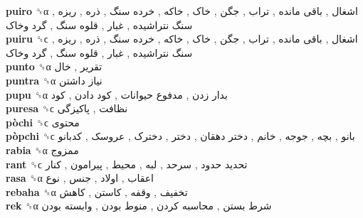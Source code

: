 \textbf{puiro} ␝α   اشغال ,  باقی مانده ,  تراب ,  جگن ,  خاک ,  خاکه ,  خرده سنگ ,  ذره ,  ریزه ,  سنگ نتراشیده ,  غبار ,  قلوه سنگ ,  گرد وخاک   \\
\textbf{puiru} ␝ϲ   اشغال ,  باقی مانده ,  تراب ,  جگن ,  خاک ,  خاکه ,  خرده سنگ ,  ذره ,  ریزه ,  سنگ نتراشیده ,  غبار ,  قلوه سنگ ,  گرد وخاک   \\
\textbf{punto} ␝α   تقریر ,  خال   \\
\textbf{puntra} ␝α   نیاز داشتن   \\
\textbf{pupu} ␝α   بدار زدن ,  مدفوع حیوانات ,  کود دادن ,  کود   \\
\textbf{puresa} ␝ϲ   نظافت ,  پاکیزگی   \\
\textbf{pòchi} ␝ϲ   محتوی   \\
\textbf{pòpchi} ␝ϲ   بانو ,  بچه ,  جوجه ,  خانم ,  دختر دهقان ,  دختر ,  دخترک ,  عروسک ,  کدبانو   \\
\textbf{rabia} ␝α   ممزوج   \\
\textbf{rant} ␝ϲ   تحدید حدود ,  سرحد ,  لبه ,  محیط ,  پیرامون ,  کنار   \\
\textbf{rasa} ␝α   اعقاب ,  اولاد ,  جنس ,  نوع   \\
\textbf{rebaha} ␝α   تخفیف ,  وقفه ,  کاستن ,  کاهش   \\
\textbf{rek} ␝α   شرط بستن ,  محاسبه کردن ,  منوط بودن ,  وابسته بودن   \\
